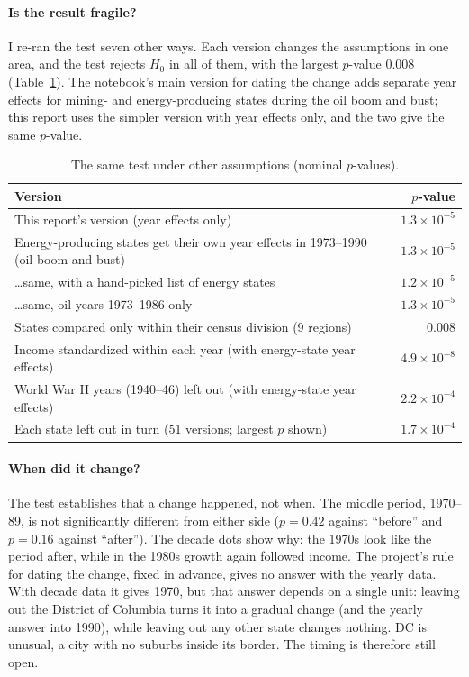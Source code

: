 \documentclass[11pt]{article}
\begin{document}
\paragraph{Is the result fragile?} I re-ran the test seven other ways. Each version changes the
assumptions in one area, and the test rejects $H_0$ in all of them, with the largest $p$-value
0.008 (Table~\ref{tab:robust}). The notebook's main version for dating the change adds separate year
effects for mining- and energy-producing states during the oil boom and bust; this report uses the
simpler version with year effects only, and the two give the same $p$-value.

\begin{table}[htbp]
\centering\small
\caption{The same test under other assumptions (nominal $p$-values).}
\label{tab:robust}
\begin{tabular}{>{\raggedright\arraybackslash}p{}r}
\toprule
Version & $p$-value \\
\midrule
This report's version (year effects only) & $1.3\times10^{-5}$ \\
Energy-producing states get their own year effects in 1973--1990 (oil boom and bust) & $1.3\times10^{-5}$ \\
\quad \ldots same, with a hand-picked list of energy states & $1.2\times10^{-5}$ \\
\quad \ldots same, oil years 1973--1986 only & $1.3\times10^{-5}$ \\
States compared only within their census division (9 regions) & 0.008 \\
Income standardized within each year (with energy-state year effects) & $4.9\times10^{-8}$ \\
World War II years (1940--46) left out (with energy-state year effects) & $2.2\times10^{-4}$ \\
Each state left out in turn (51 versions; largest $p$ shown) & $1.7\times10^{-4}$ \\
\bottomrule
\end{tabular}
\end{table}

\paragraph{When did it change?} The test establishes that a change happened, not when. The
middle period, 1970--89, is not significantly different from either side ($p = 0.42$ against
``before'' and $p = 0.16$ against ``after''). The decade dots show why: the 1970s look like the
period after, while in the 1980s growth again followed income. The project's rule for dating the
change, fixed in advance, gives no answer with the yearly data. With decade data it gives 1970, but
that answer depends on a single unit: leaving out the District of Columbia turns it into a gradual
change (and the yearly answer into 1990), while leaving out any other state changes nothing. DC is unusual, a city with no suburbs
inside its border. The timing is therefore still open.
\end{document}

